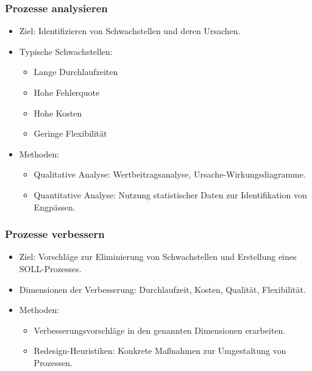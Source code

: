     \subsubsection{Prozesse analysieren} 
        \begin{itemize}
            \item Ziel: Identifizieren von Schwachstellen und deren Ursachen.
            \item Typische Schwachstellen:
            \begin{itemize}
                \item Lange Durchlaufzeiten
                \item Hohe Fehlerquote
                \item Hohe Kosten
                \item Geringe Flexibilität
            \end{itemize}
            \item Methoden:
            \begin{itemize}
                \item Qualitative Analyse: Wertbeitragsanalyse, Ursache-Wirkungsdiagramme.
                \item Quantitative Analyse: Nutzung statistischer Daten zur Identifikation von Engpässen.
            \end{itemize}
        \end{itemize}

    \subsubsection{Prozesse verbessern}  
        \begin{itemize}
            \item Ziel: Vorschläge zur Eliminierung von Schwachstellen und Erstellung eines SOLL-Prozesses.
            \item Dimensionen der Verbesserung: Durchlaufzeit, Kosten, Qualität, Flexibilität.
            \item Methoden:
            \begin{itemize}
                \item Verbesserungsvorschläge in den genannten Dimensionen erarbeiten.
                \item Redesign-Heuristiken: Konkrete Maßnahmen zur Umgestaltung von Prozessen.
            \end{itemize}
        \end{itemize}

